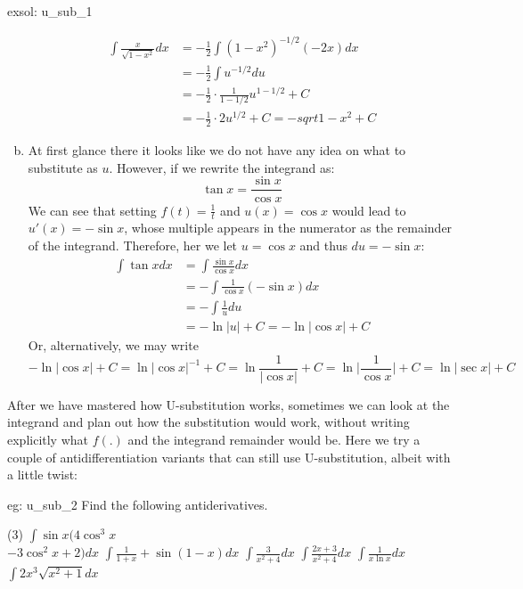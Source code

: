 \begin{exsol}[]{exsol: u_sub_1}
\begin{enumerate}[a)]
        \begin{align*}
            \int \frac{x}{\sqrt{1-x^2}} dx &= -\frac{1}{2}\int (1-x^2)^{-1/2} (-2x)dx\\
            &= -\frac{1}{2}\int u^{-1/2} du\\
            &= -\frac{1}{2} \cdot \frac{1}{1-1/2} u^{1-1/2} + C \\
            &= -\frac{1}{2} \cdot 2 u^{1/2} + C = -sqrt{1-x^2} + C
        \end{align*}
        \item At first glance there it looks like we do not have any idea on what to substitute as $u$.  However, if we rewrite the integrand as:
        \[\tan x = \frac{\sin x}{\cos x}\]
        We can see that setting $f(t)= \frac{1}{t}$ and $u(x) = \cos x$ would lead to $u'(x) = -\sin x$, whose multiple appears in the numerator as the remainder of the integrand.  Therefore, her we let $u = \cos x$ and thus $du = -\sin x$:
        \begin{align*}
            \int \tan x dx &= \int \frac{\sin x}{\cos x} dx\\
            &= -\int \frac{1}{\cos x} (-\sin x)dx\\
            &= -\int \frac{1}{u} du\\
            &= -\ln |u| + C = -\ln|\cos x| + C
        \end{align*}
        Or, alternatively, we may write
        \begin{equation*}
            -\ln |\cos x| + C = \ln |\cos x|^{-1} + C= \ln \frac{1}{|\cos x|} + C = \ln \Big|\frac{1}{\cos x}\Big| + C = \ln |\sec x| + C
        \end{equation*}
    \end{enumerate}
\end{exsol}
After we have mastered how U-substitution works, sometimes we can look at the integrand and plan out how the substitution would work, without writing explicitly what $f(.)$ and the integrand remainder would be.  Here we try a couple of antidifferentiation variants that can still use U-substitution, albeit with a little twist:
\begin{eg}[]{eg: u_sub_2}
    Find the following antiderivatives.
    \begin{tasks}(3)
        \task $\int \sin x(4\cos^3 x$\\ $- 3\cos^2x + 2) dx$
        \task $\int \frac{1}{1+x} + \sin(1-x) dx$
        \task $\int \frac{3}{x^2+4} dx$
        \task $\int \frac{2x+3}{x^2+4} dx$
        \task $\int \frac{1}{x \ln x} dx$
        \task $\int 2x^3\sqrt{x^2+1} dx$
    \end{tasks}
\end{eg}
